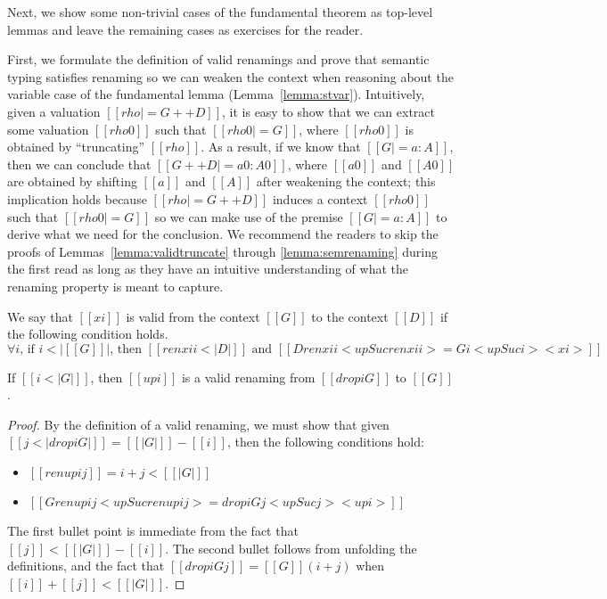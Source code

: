 \documentclass[acmsmall,screen=true,
\ifpublic review=false\else,review=true\fi
  ,anonymous=\ifanonymous true\else false\fi]{acmart}
\newcommand{\scw}[1]{}
\begin{document}
Next, we show some non-trivial cases of the fundamental theorem as
top-level lemmas and leave the remaining cases as exercises for the
reader.\scw{I dislike leaving ``exercises to the reader''}

First, we formulate the definition of valid renamings and prove that
semantic typing satisfies renaming so we can weaken the context when
reasoning about the variable case of the fundamental lemma
(Lemma~\ref{lemma:stvar}). Intuitively, given a valuation $[[rho |= G
++ D]]$, it is easy to show that we can extract some valuation
$[[rho0]]$ such that $[[rho0 |= G]]$, where $[[rho0]]$ is obtained by
``truncating'' $[[rho]]$. As a result, if we know that $[[G |= a :
A]]$, then we can conclude that $[[G ++ D |= a0 : A0 ]]$, where
$[[a0]]$ and $[[A0]]$ are obtained by shifting $[[a]]$ and $[[A]]$
after weakening the context; this implication holds because $[[rho |=
G ++ D]]$ induces a context $[[rho0]]$ such that $[[rho0 |= G]]$ so we
can make use of the premise $[[G |= a : A]]$ to derive what we need
for the conclusion. We recommend the readers to skip the proofs of
Lemmas~\ref{lemma:validtruncate} through \ref{lemma:semrenaming}
during the first read as long as they have an intuitive understanding
of what the renaming property is meant to capture.

\scw{Make this a definition? Would it be useful to create notation
  for the relation, such as $[[xi]]:[[G]]\Rightarrow[[D]]$? }
We say that $[[xi]]$ is
valid from the context $[[G]]$ to the context $[[D]]$ if the
following condition holds.
\[ \forall i \text{, if } i < | [[G]] |\text{, then }[[ ren xi i < |D| ]] \text{ and }
  [[D ren xi
  i < up Suc ren xi i > = G i < up Suc i > < xi >]] \]

\begin{lemma}
  \label{lemma:validtruncate}
  If $[[i < |G|]]$, then $[[up i]]$ is a valid renaming from $[[drop i
  G]]$ to $[[G]]$.
\end{lemma}
\begin{proof}
  By the definition of a valid renaming, we must show that given $[[j
  < |drop i G|]] = [[|G|]] - [[i]]$, then the following conditions hold:
  \begin{itemize}
  \item $[[ren up i j]] = i + j  < [[| G | ]]$
  \item $[[G ren up i j < up Suc ren up i j > = drop i G j < up Suc j > < up i >]]$
  \end{itemize}
  The first bullet point is immediate from the fact that $[[j]] <
  [[|G|]] - [[i]]$. The second bullet follows from unfolding the
  definitions, and the fact that $[[drop i G j]] = [[G]](i + j)$ when
  $[[i]] + [[j]] < [[|G|]]$.
\end{proof}
\end{document}
